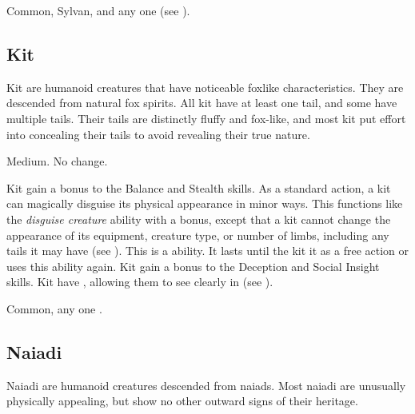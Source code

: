          Common, Sylvan, and any one  (see ).

    \subsection{Kit}

        Kit are humanoid creatures that have noticeable foxlike characteristics.
        They are descended from natural fox spirits.
        All kit have at least one tail, and some have multiple tails.
        Their tails are distinctly fluffy and fox-like, and most kit put effort into concealing their tails to avoid revealing their true nature.

         Medium.
         No change.
        \begin{itemize}
             Kit gain a  bonus to the Balance and Stealth skills.
             As a standard action, a kit can magically disguise its physical appearance in minor ways.
                This functions like the \textit{disguise creature} ability with a  bonus, except that a kit cannot change the appearance of its equipment, creature type, or number of limbs, including any tails it may have (see ).
                This is a  ability.
                It lasts until the kit  it as a free action or uses this ability again.
             Kit gain a  bonus to the Deception and Social Insight skills.
             Kit have , allowing them to see clearly in  (see ).
        \end{itemize}
         Common, any one .

    \subsection{Naiadi}
        Naiadi are humanoid creatures descended from naiads.
        Most naiadi are unusually physically appealing, but show no other outward signs of their heritage.

